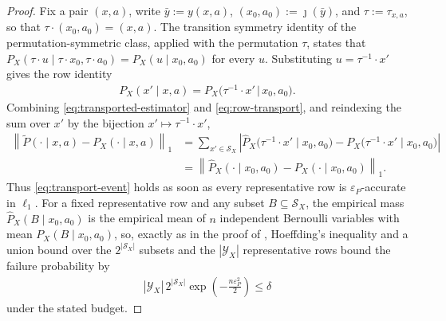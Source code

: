 \documentclass{article}
\theoremstyle{plain}
\theoremstyle{definition}
\theoremstyle{remark}
\newcommand{\abs}[1]{\left\lvert#1\right\rvert}
\newcommand{\norm}[1]{\left\lVert#1\right\rVert}
\newcommand{\trP}{\widetilde{P}}
\begin{document}
\begin{proof}
Fix a pair $(x,a)$, write $\bar y:=y(x,a)$,
$(x_0,a_0):=\jmath(\bar y)$, and $\tau:=\tau_{x,a}$, so that
$\tau\mathbin{\cdot}(x_0,a_0)=(x,a)$. The transition symmetry identity of the
permutation-symmetric class, applied with the permutation $\tau$, states that
$P_X(\tau\mathbin{\cdot}u\mid
\tau\mathbin{\cdot}x_0,\tau\mathbin{\cdot}a_0)
=P_X(u\mid x_0,a_0)$ for every $u$. Substituting
$u=\tau^{-1}\mathbin{\cdot}x'$ gives the row identity
\begin{align}
  P_X(x'\mid x,a)
  =
  P_X\big(\tau^{-1}\mathbin{\cdot}x'\,\big|\,x_0,a_0\big).
  \label{eq:row-transport}
\end{align}
Combining \eqref{eq:transported-estimator} and \eqref{eq:row-transport}, and
reindexing the sum over $x'$ by the bijection
$x'\mapsto\tau^{-1}\mathbin{\cdot}x'$,
\begin{align*}
  \norm{\trP(\cdot\mid x,a)-P_X(\cdot\mid x,a)}_1
  &=
  \sum_{x'\in\mathcal S_X}
  \abs{
    \widehat{P}_X\big(\tau^{-1}\mathbin{\cdot}x'\mid x_0,a_0\big)
    -
    P_X\big(\tau^{-1}\mathbin{\cdot}x'\mid x_0,a_0\big)
  }\\
  &=
  \norm{\widehat{P}_X(\cdot\mid x_0,a_0)-P_X(\cdot\mid x_0,a_0)}_1.
\end{align*}
Thus \eqref{eq:transport-event} holds as soon as every representative row is
$\varepsilon_P$-accurate in $\ell_1$. For a fixed representative row and any
subset $B\subseteq\mathcal S_X$, the empirical mass
$\widehat{P}_X(B\mid x_0,a_0)$ is the empirical mean of $n$ independent
Bernoulli variables with mean $P_X(B\mid x_0,a_0)$, so, exactly as in the
proof of , Hoeffding's inequality and a union
bound over the $2^{\abs{\mathcal S_X}}$ subsets and the
$\abs{\mathcal Y_X}$ representative rows bound the failure probability by
\begin{align*}
  \abs{\mathcal Y_X}\,
  2^{\abs{\mathcal S_X}}
  \exp\left(-\frac{n\varepsilon_P^2}{2}\right)
  \le
  \delta
\end{align*}
under the stated budget.
\end{proof}
\end{document}
